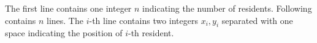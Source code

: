 The first line contains one integer $n$ indicating the number of residents.
Following contains $n$ lines.
The $i$-th line contains two integers $x_i,y_i$ separated with one space indicating the position of $i$-th resident.

